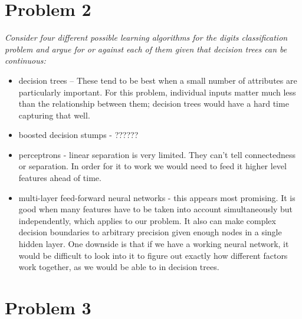 \documentclass{article}
\begin{document}
  \section*{Problem 2}
  \textit{Consider four different possible learning algorithms for the
    digits classification problem and argue for or against each of
    them given that decision trees can be continuous:}
  \begin{itemize}
  \item decision trees -- These tend to be best when a small number of
    attributes are particularly important. For this problem,
    individual inputs matter much less than the relationship between
    them; decision trees would have a hard time capturing that well.
  \item boosted decision stumps - ??????
  \item perceptrons - linear separation is very limited. They can't tell 
    connectedness or separation. In order for it to work we would need to
    feed it higher level features ahead of time.  

  \item multi-layer feed-forward neural networks - this appears most promising. 
    It is good when many features have to be taken into account simultaneously
    but independently, which applies to our problem. It also can make complex 
    decision boundaries to arbitrary precision given enough nodes in a single
    hidden layer. One downside is that if we have a working neural network,
    it would be difficult to look into it to figure out exactly how different
    factors work together, as we would be able to in decision trees. 
  \end{itemize}

  \section*{Problem 3}
\end{document}
